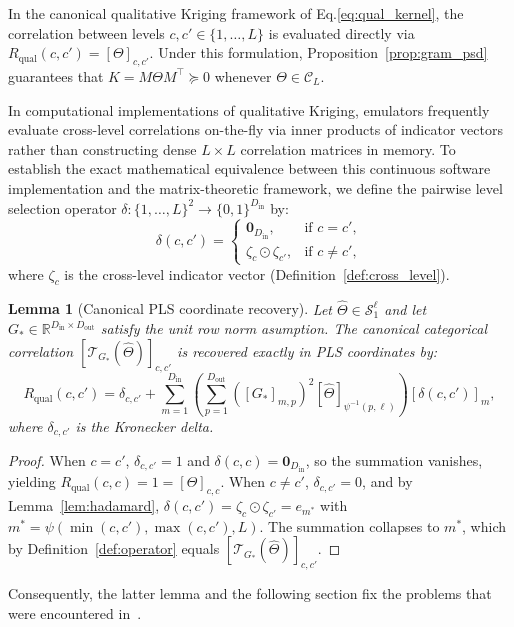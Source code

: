 \documentclass[default,sn-mathphys,Numbered]{sn-jnl}
\theoremstyle{thmstyleone}
\newtheorem{lemma}[theorem]{Lemma}
\theoremstyle{thmstylethree}
\theoremstyle{thmstyletwo}
\newcommand{\inp}{\text{in}}
\newcommand{\outp}{\text{out}}
\newcommand{\eqnref}[1]{\eqref{#1}}
\begin{document}
In the canonical qualitative Kriging framework of Eq.\eqnref{eq:qual_kernel}, the correlation between levels $c, c' \in \{1, \ldots, L\}$ is evaluated directly via $R_{\mathrm{qual}}(c, c') = [\Theta]_{c, c'}$. Under this formulation, Proposition~\ref{prop:gram_psd} guarantees that $K = M \Theta M^\top \succeq 0$ whenever $\Theta \in \mathcal{C}_L$.

In computational implementations of qualitative Kriging, emulators frequently evaluate cross-level correlations on-the-fly via inner products of indicator vectors rather than constructing dense $L \times L$ correlation matrices in memory. To establish the exact mathematical equivalence between this continuous software implementation and the matrix-theoretic framework, we define the pairwise level selection operator $\delta : \{1, \ldots, L\}^2 \to \{0, 1\}^{D_{\inp}}$ by:
\begin{equation}
\label{eq:delta_selection}
\delta(c, c') =
\begin{cases}
\bm{0}_{D_{\inp}}, & \text{if } c = c', \\
\zeta_c \odot \zeta_{c'}, & \text{if } c \neq c',
\end{cases}
\end{equation}
where $\zeta_c$ is the cross-level indicator vector (Definition~\ref{def:cross_level}).

\begin{lemma}[Canonical PLS coordinate recovery]
\label{lem:canonical_pls_recov}\label{th:canonical_pls_recov}
Let $\hat{\Theta} \in \mathcal{S}_1^\ell$ and let $G_* \in \mathbb{R}^{D_{\inp} \times D_{\outp}}$ satisfy the unit row norm asumption. The canonical categorical correlation $[\mathcal{T}_{G_*}(\hat{\Theta})]_{c, c'}$ is recovered exactly in PLS coordinates by:
\begin{equation}
\label{eq:canonical_pls_eval}
R_{\mathrm{qual}}(c, c') = \delta_{c, c'} + \sum_{m=1}^{D_{\inp}} \left( \sum_{p=1}^{D_{\outp}} \left([G_*]_{m, p}\right)^2 [\hat{\Theta}]_{\psi^{-1}(p, \ell)} \right) [\delta(c, c')]_m,
\end{equation}
where $\delta_{c, c'}$ is the Kronecker delta.
\end{lemma}

\begin{proof}
When $c = c'$, $\delta_{c, c'} = 1$ and $\delta(c, c) = \bm{0}_{D_{\inp}}$, so the summation vanishes, yielding $R_{\mathrm{qual}}(c, c) = 1 = [\Theta]_{c, c}$. When $c \neq c'$, $\delta_{c, c'} = 0$, and by Lemma~\ref{lem:hadamard}, $\delta(c, c') = \zeta_c \odot \zeta_{c'} = e_{m^*}$ with $m^* = \psi(\min(c, c'), \max(c, c'), L)$. The summation collapses to $m^*$, which by Definition~\ref{def:operator} equals $[\mathcal{T}_{G_*}(\hat{\Theta})]_{c, c'}$.
\end{proof}
Consequently, the latter lemma and the following section fix the problems that were encountered in~\citep{saves2023high}.
\end{document}
